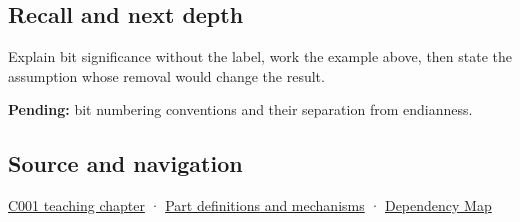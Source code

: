 \subsection{Recall and next depth}\label{appendix-280445746493-recall-and-next-depth}

Explain bit significance without the label, work the example above, then state the assumption whose removal would change the result.

\textbf{Pending:} bit numbering conventions and their separation from endianness.

\subsection{Source and navigation}\label{appendix-280445746493-source-and-navigation}

\hyperref[01-foundations-i-ch001-from-a-signal-to-an-interpretation]{C001 teaching chapter} · \hyperref[appendix-fd090d982a15]{Part definitions and mechanisms} · \hyperref[appendix-4ad47bdd269a]{Dependency Map}
